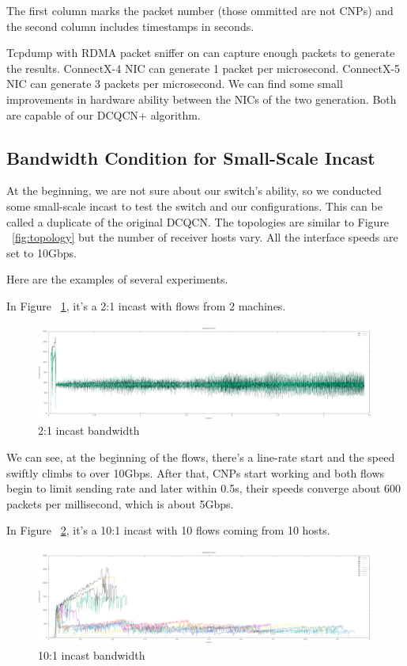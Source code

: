 \documentclass[12pt,a4paper]{article}
\begin{document}
The first column marks the packet number (those ommitted are not CNPs) and the second column includes timestamps in seconds.

Tcpdump with RDMA packet sniffer on can capture enough packets to generate the results.
ConnectX-4 NIC can generate 1 packet per microsecond.
ConnectX-5 NIC can generate 3 packets per microsecond.
We can find some small improvements in hardware ability between the NICs of the two generation.
Both are capable of our DCQCN+ algorithm.

\subsection{Bandwidth Condition for Small-Scale Incast}
At the beginning, we are not sure about our switch's ability, so we conducted some small-scale incast to test the switch and our configurations.
This can be called a duplicate of the original DCQCN.
The topologies are similar to Figure ~\ref{fig:topology} but the number of receiver hosts vary.
All the interface speeds are set to 10Gbps.

Here are the examples of several experiments.

In Figure ~\ref{fig:2on1_1}, it's a 2:1 incast with flows from 2 machines.

\begin{figure}[ht]
	\begin{center}
		\includegraphics[width=6in]{2on1_1}
		\caption{2:1 incast bandwidth}
		\label{fig:2on1_1}
	\end{center}
\end{figure}

We can see, at the beginning of the flows, there's a line-rate start and the speed swiftly climbs to over 10Gbps.
After that, CNPs start working and both flows begin to limit sending rate and later within 0.5s, their speeds converge about
600 packets per millisecond, which is about 5Gbps.

In Figure ~\ref{fig:10on1_1}, it's a 10:1 incast with 10 flows coming from 10 hosts.

\begin{figure}[ht]
	\begin{center}
		\includegraphics[width=6in]{10on1_1}
		\caption{10:1 incast bandwidth}
		\label{fig:10on1_1}
	\end{center}
\end{figure}
\end{document}
